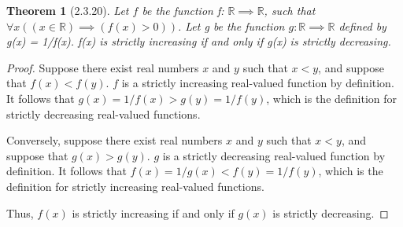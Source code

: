 \documentclass[a4paper, 12pt]{article}
\theoremstyle{plain}
\newtheorem*{theorem*}{Theorem}
\begin{document}
	
	\begin{theorem*}[2.3.20]
		Let $f$ be the function f: $\mathbb{R} \implies \mathbb{R}$, such that \newline 
		$\forall x ((x \in \mathbb{R}) \implies (f(x) > 0))$. Let g be the function 
		$g: \mathbb{R} \implies \mathbb{R}$ defined by g(x) = 1/f(x). f(x) is strictly increasing 
		if and only if g(x) is strictly decreasing.
	\end{theorem*}
	
	\begin{proof}
		Suppose there exist real numbers $x$ and $y$ such that $x < y$, and suppose that 
		$f(x) < f(y)$. $f$ is a strictly increasing real-valued function by definition. It 
		follows that $g(x) = 1/f(x) > g(y) = 1/f(y)$, which is the definition for strictly 
		decreasing real-valued functions.
		
		Conversely, suppose there exist real numbers $x$ and $y$ such that $x < y$, and suppose that 
		$g(x) > g(y)$. $g$ is a strictly decreasing real-valued function by definition. It follows that 
		$f(x) = 1/g(x) < f(y) = 1/f(y)$, which is the definition for strictly increasing real-valued 
		functions.
		
		Thus, $f(x)$ is strictly increasing if and only if $g(x)$ is strictly decreasing.
	\end{proof}
\end{document}
